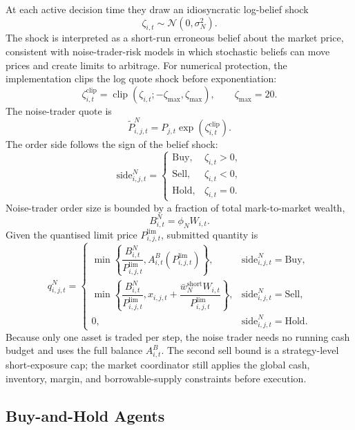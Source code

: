 \documentclass[12pt, a4paper]{article}
\DeclareMathOperator{\clip}{clip}
\begin{document}
    At each active decision time they draw an idiosyncratic log-belief shock
    \[
        \zeta_{i,t}\sim\mathcal{N}(0,\sigma_N^2).
    \]
    The shock is interpreted as a short-run erroneous belief about the market price,
    consistent with noise-trader-risk models in which stochastic beliefs can move
    prices and create limits to arbitrage. For numerical protection, the
    implementation clips the log quote shock before exponentiation:
    \[
        \zeta_{i,t}^{\mathrm{clip}}
        =
        \clip\!\left(\zeta_{i,t};-\zeta_{\max},\zeta_{\max}\right),
        \qquad
        \zeta_{\max}=20.
    \]
    The noise-trader quote is
    \[
        \tilde P_{i,j,t}^{N}=P_{j,t}\exp(\zeta_{i,t}^{\mathrm{clip}}).
    \]
    The order side follows the sign of the belief shock:
    \[
        \mathrm{side}_{i,j,t}^{N}=
        \begin{cases}
            \mathrm{Buy}, & \zeta_{i,t}>0,\\
            \mathrm{Sell}, & \zeta_{i,t}<0,\\
            \mathrm{Hold}, & \zeta_{i,t}=0.
        \end{cases}
    \]
    Noise-trader order size is bounded by a fraction of total mark-to-market
    wealth,
    \[
        B_{i,t}^{N}=\phi_N W_{i,t}.
    \]
    Given the quantised limit price \(P_{i,j,t}^{\text{lim}}\), submitted quantity is
    \[
        q_{i,j,t}^{N}=
        \begin{cases}
            \min\left\{\dfrac{B_{i,t}^{N}}{P_{i,j,t}^{\text{lim}}},
                    A_{i,t}^{B}(P_{i,j,t}^{\text{lim}})\right\}, & \mathrm{side}_{i,j,t}^{N}=\mathrm{Buy},\\[1.2ex]
            \min\left\{\dfrac{B_{i,t}^{N}}{P_{i,j,t}^{\text{lim}}},
            x_{i,j,t}+\dfrac{\bar w_N^{\text{short}}W_{i,t}}{P_{i,j,t}^{\text{lim}}}\right\}, & \mathrm{side}_{i,j,t}^{N}=\mathrm{Sell},\\[1.2ex]
            0, & \mathrm{side}_{i,j,t}^{N}=\mathrm{Hold}.
        \end{cases}
    \]
    Because only one asset is traded per step, the noise trader needs no running
    cash budget and uses the full balance \(A_{i,t}^{B}\).
    The second sell bound is a strategy-level short-exposure cap; the market
    coordinator still applies the global cash, inventory, margin, and
    borrowable-supply constraints before execution.

    \subsection{Buy-and-Hold Agents}
\end{document}
